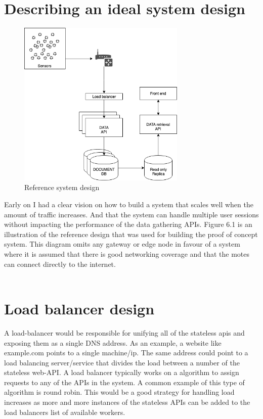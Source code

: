 \documentclass[]{uiophd}
\begin{document}
\section{Describing an ideal system design}
\begin{figure}[h]
\caption{Reference system design}
\centering
\includegraphics[width=8cm]{ideal_system_design.png}

\end{figure}
Early on I had a clear vision on how to build a system that scales well when the amount of traffic increases. And that the system can handle multiple user sessions without impacting the performance of the data gathering APIs. Figure 6.1 is an illustration of the reference design that was used for building the proof of concept system. This diagram omits any gateway or edge node in favour of a system where it is assumed that there is good networking coverage and that the motes can connect directly to the internet.
\\\\
\section{Load balancer design}
A load-balancer would be responsible for unifying all of the stateless apis and exposing them as a single DNS address. As an example, a website like example.com points to a single machine/ip. The same address could point to a load balancing server/service that divides the load between a number of the stateless web-API. A load balancer typically works on a algorithm to assign requests to any of the APIs in the system. A common example of this type of algorithm is round robin. This would be a good strategy for handling load increases as more and more instances of the stateless APIs can be added to the load balancers list of available workers.
\end{document}
